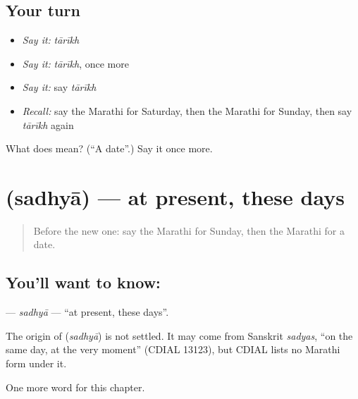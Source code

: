 \subsection*{Your turn}
\begin{itemize}
\raggedright
  \item \emph{Say it:} \emph{tārīkh}
  \item \emph{Say it:} \emph{tārīkh}, once more
  \item \emph{Say it:} say \emph{tārīkh}
  \item \emph{Recall:} say the Marathi for Saturday, then the Marathi for Sunday, then say \emph{tārīkh} again
\end{itemize}

\begin{tcolorbox}[breakable,colback=teal!4,colframe=teal!35!black,title={Before you move on}]
What does  mean? (\textquotedblleft{}A date\textquotedblright{}.) Say it once more.
\end{tcolorbox}
\section[\texorpdfstring{\mr{सध्या} (sadhyā)}{सध्या (sadhyā)}]{ (sadhyā) — at present, these days}

\label{lesson:MR-C126-sadhya}



\begin{quote}
Before the new one: say the Marathi for Sunday, then the Marathi for a date.
\end{quote}

\subsection*{You'll want to know: }
\textbf{} — \emph{sadhyā} — \textquotedblleft{}at present, these days\textquotedblright{}.

\begin{cousinweb}
The origin of \textbf{} (\emph{sadhyā}) is not settled. It may come from Sanskrit \emph{sadyas}, \textquotedblleft{}on the same day, at the very moment\textquotedblright{} (CDIAL 13123), but CDIAL lists no Marathi form under it.
\end{cousinweb}

\begin{grammarlens}[title={What you've built}]
One more word for this chapter.
\end{grammarlens}

